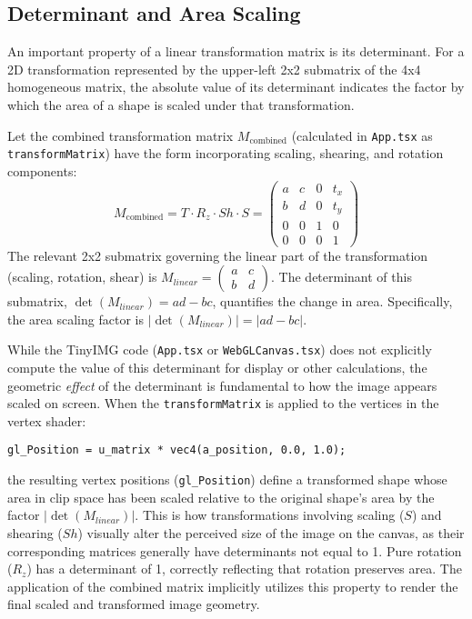 \documentclass{article}
\begin{document}
\subsection{Determinant and Area Scaling}
An important property of a linear transformation matrix is its determinant. For a 2D transformation represented by the upper-left 2x2 submatrix of the 4x4 homogeneous matrix, the absolute value of its determinant indicates the factor by which the area of a shape is scaled under that transformation.

Let the combined transformation matrix $M_{\text{combined}}$ (calculated in \texttt{App.tsx} as \texttt{transformMatrix}) have the form incorporating scaling, shearing, and rotation components:
\[
M_{\text{combined}} = T \cdot R_z \cdot Sh \cdot S =
\begin{pmatrix}
a & c & 0 & t_x \\
b & d & 0 & t_y \\
0 & 0 & 1 & 0 \\
0 & 0 & 0 & 1
\end{pmatrix}
\]
The relevant 2x2 submatrix governing the linear part of the transformation (scaling, rotation, shear) is $M_{linear} = \begin{pmatrix} a & c \\ b & d \end{pmatrix}$. The determinant of this submatrix, $\det(M_{linear}) = ad - bc$, quantifies the change in area. Specifically, the area scaling factor is $|\det(M_{linear})| = |ad - bc|$.

While the TinyIMG code (\texttt{App.tsx} or \texttt{WebGLCanvas.tsx}) does not explicitly compute the value of this determinant for display or other calculations, the geometric \textit{effect} of the determinant is fundamental to how the image appears scaled on screen. When the \texttt{transformMatrix} is applied to the vertices in the vertex shader:
\begin{verbatim}
gl_Position = u_matrix * vec4(a_position, 0.0, 1.0);
\end{verbatim}
the resulting vertex positions (\texttt{gl\_Position}) define a transformed shape whose area in clip space has been scaled relative to the original shape's area by the factor $|\det(M_{linear})|$. This is how transformations involving scaling ($S$) and shearing ($Sh$) visually alter the perceived size of the image on the canvas, as their corresponding matrices generally have determinants not equal to 1. Pure rotation ($R_z$) has a determinant of 1, correctly reflecting that rotation preserves area. The application of the combined matrix implicitly utilizes this property to render the final scaled and transformed image geometry.
\end{document}
